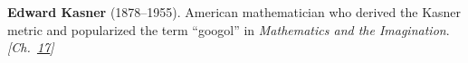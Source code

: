 \textbf{Edward Kasner} (1878–1955). American mathematician who derived the Kasner metric and popularized the term ``googol'' in \emph{Mathematics and the Imagination}. \emph{[Ch.~\hyperref[ch:bignumbers]{17}]}

